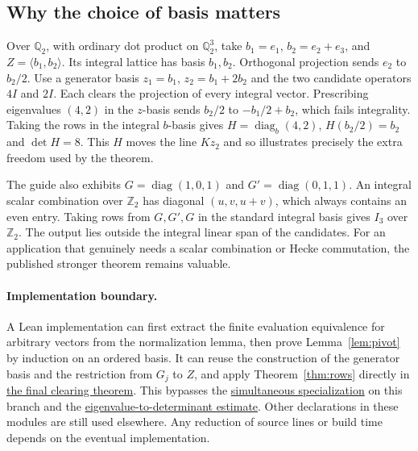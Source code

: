 \documentclass[11pt,letterpaper]{article}
\newcommand{\Z}{\mathbb Z}
\newcommand{\Q}{\mathbb Q}
\newcommand{\src}[3]{\href{https://github.com/VladimirReshetnikov/ProveIt/blob/89d12dd40424f1217fd818d84877b3da52396a3b/Analysis/GeneralizedRiemannHypothesis/Lean/grh/src/#1.lean\#L#2}{#3}}
\newcommand{\db}[2]{\src{New/Congruences/FirstOrder/DenominatorBound}{#1}{#2}}
\begin{document}
\subsection{Why the choice of basis matters}
Over $\Q_2$, with ordinary dot product on $\Q_2^3$, take $b_1=e_1$, $b_2=e_2+e_3$, and $Z=\langle b_1,b_2\rangle$. Its integral lattice has basis $b_1,b_2$. Orthogonal projection sends $e_2$ to $b_2/2$. Use a generator basis $z_1=b_1$, $z_2=b_1+2b_2$ and the two candidate operators $4I$ and $2I$. Each clears the projection of every integral vector. Prescribing eigenvalues $(4,2)$ in the $z$-basis sends $b_2/2$ to $-b_1/2+b_2$, which fails integrality. Taking the rows in the integral $b$-basis gives $H=\operatorname{diag}_b(4,2)$, $H(b_2/2)=b_2$ and $\det H=8$. This $H$ moves the line $Kz_2$ and so illustrates precisely the extra freedom used by the theorem.

The guide also exhibits $G=\operatorname{diag}(1,0,1)$ and $G'=\operatorname{diag}(0,1,1)$. An integral scalar combination over $\Z_2$ has diagonal $(u,v,u+v)$, which always contains an even entry. Taking rows from $G,G',G$ in the standard integral basis gives $I_3$ over $\Z_2$. The output lies outside the integral linear span of the candidates. For an application that genuinely needs a scalar combination or Hecke commutation, the published stronger theorem remains valuable.

\paragraph{Implementation boundary.}
A Lean implementation can first extract the finite evaluation equivalence for arbitrary vectors from the normalization lemma, then prove Lemma~\ref{lem:pivot} by induction on an ordered basis. It can reuse the construction of the generator basis and the restriction from $G_j$ to $Z$, and apply Theorem~\ref{thm:rows} directly in \db{1246}{the final clearing theorem}. This bypasses the \src{New/Congruences/FirstOrder/HeckeStrings}{59}{simultaneous specialization} on this branch and the \db{1219}{eigenvalue-to-determinant estimate}. Other declarations in these modules are still used elsewhere. Any reduction of source lines or build time depends on the eventual implementation.




\end{document}
